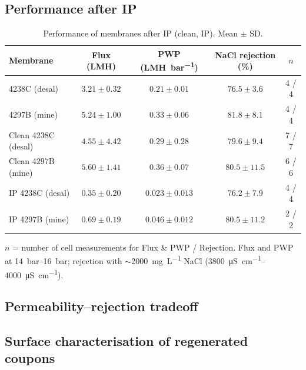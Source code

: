 \subsection{Performance after IP}
\label{sec:res-ip-perf}

  \begin{table}[htbp]
  \centering
  \caption{Performance of membranes after IP (clean, IP).
  Mean $\pm$ SD.}
  \label{tab:ip-results}
    \begin{tabular}{lcccc}
    \toprule
    Membrane & Flux (\unit{LMH}) & PWP (\unit{LMH.bar^{-1}}) & NaCl rejection (\%) & $n$ \\
    \midrule
    4238C (desal) & $3.21 \pm 0.32$ & $0.21 \pm 0.01$ & $76.5 \pm 3.6$ & 4 / 4 \\
    4297B (mine)  & $5.24 \pm 1.00$ & $0.33 \pm 0.06$ & $81.8 \pm 8.1$ & 4 / 4 \\
    Clean 4238C (desal) & $4.55 \pm 4.42$ & $0.29 \pm 0.28$ & $79.6 \pm 9.4$ & 7 / 7 \\
    Clean 4297B (mine)  & $5.60 \pm 1.41$ & $0.36 \pm 0.07$ & $80.5 \pm 11.5$ & 6 / 6 \\
    IP 4238C (desal) & $0.35 \pm 0.20$ & $0.023 \pm 0.013$ & $76.2 \pm 7.9$ & 4 / 4 \\
    IP 4297B (mine)  & $0.69 \pm 0.19$ & $0.046 \pm 0.012$ & $80.5 \pm 11.2$ & 2 / 2 \\
    \bottomrule
  \end{tabular}
  \par\smallskip
  \footnotesize $n$ = number of cell measurements for Flux \& PWP / Rejection.
  Flux and PWP at \qtyrange{14}{16}{bar}; rejection with $\sim$\qty{2000}{mg.L^{-1}} NaCl
  (\qtyrange{3800}{4000}{\micro S.cm^{-1}}).
  \end{table}

\subsection{Permeability--rejection tradeoff}
\label{sec:res-tradeoff}

\subsection{Surface characterisation of regenerated coupons}
\label{sec:res-ip-surface}




